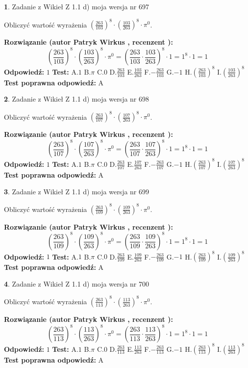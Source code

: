 \documentclass[12pt, a4paper]{article}
\theoremstyle{definition} %
\newtheorem{zad}{}
\newcommand{\zadStart}[1]{\begin{zad}#1\newline}
\newcommand{\zadStop}{\end{zad}}
\newcommand{\rozwStart}[2]{\noindent \textbf{Rozwiązanie (autor #1 , recenzent #2): }\newline}
\newcommand{\rozwStop}{\newline}
\newcommand{\odpStart}{\noindent \textbf{Odpowiedź:}\newline}
\newcommand{\odpStop}{\newline}
\newcommand{\testStart}{\noindent \textbf{Test:}\newline}
\newcommand{\testStop}{\newline}
\newcommand{\kluczStart}{\noindent \textbf{Test poprawna odpowiedź:}\newline}
\newcommand{\kluczStop}{\newline}
\begin{document}
\zadStart{Zadanie z Wikieł Z 1.1 d) moja wersja nr 697}

Obliczyć wartość wyrażenia $(\frac{263}{103})^{8} \cdot (\frac{103}{263})^{8} \cdot \pi^{0}$.
\zadStop
\rozwStart{Patryk Wirkus}{}
$$(\frac{263}{103})^{8} \cdot (\frac{103}{263})^{8} \cdot \pi^{0} = (\frac{263}{103} \cdot \frac{103}{263})^{8} \cdot 1 = 1^{8} \cdot 1 = 1$$
\rozwStop
\odpStart
$1$
\odpStop
\testStart
A.$1$ B.$\pi$ C.$0$ D.$\frac{263}{103}$ E.$\frac{103}{263}$
F.$-\frac{263}{103}$ G.$-1$
H.$(\frac{263}{103})^{8}$
I.$(\frac{103}{263})^{8}$
\testStop
\kluczStart
A
\kluczStop



\zadStart{Zadanie z Wikieł Z 1.1 d) moja wersja nr 698}

Obliczyć wartość wyrażenia $(\frac{263}{107})^{8} \cdot (\frac{107}{263})^{8} \cdot \pi^{0}$.
\zadStop
\rozwStart{Patryk Wirkus}{}
$$(\frac{263}{107})^{8} \cdot (\frac{107}{263})^{8} \cdot \pi^{0} = (\frac{263}{107} \cdot \frac{107}{263})^{8} \cdot 1 = 1^{8} \cdot 1 = 1$$
\rozwStop
\odpStart
$1$
\odpStop
\testStart
A.$1$ B.$\pi$ C.$0$ D.$\frac{263}{107}$ E.$\frac{107}{263}$
F.$-\frac{263}{107}$ G.$-1$
H.$(\frac{263}{107})^{8}$
I.$(\frac{107}{263})^{8}$
\testStop
\kluczStart
A
\kluczStop



\zadStart{Zadanie z Wikieł Z 1.1 d) moja wersja nr 699}

Obliczyć wartość wyrażenia $(\frac{263}{109})^{8} \cdot (\frac{109}{263})^{8} \cdot \pi^{0}$.
\zadStop
\rozwStart{Patryk Wirkus}{}
$$(\frac{263}{109})^{8} \cdot (\frac{109}{263})^{8} \cdot \pi^{0} = (\frac{263}{109} \cdot \frac{109}{263})^{8} \cdot 1 = 1^{8} \cdot 1 = 1$$
\rozwStop
\odpStart
$1$
\odpStop
\testStart
A.$1$ B.$\pi$ C.$0$ D.$\frac{263}{109}$ E.$\frac{109}{263}$
F.$-\frac{263}{109}$ G.$-1$
H.$(\frac{263}{109})^{8}$
I.$(\frac{109}{263})^{8}$
\testStop
\kluczStart
A
\kluczStop



\zadStart{Zadanie z Wikieł Z 1.1 d) moja wersja nr 700}

Obliczyć wartość wyrażenia $(\frac{263}{113})^{8} \cdot (\frac{113}{263})^{8} \cdot \pi^{0}$.
\zadStop
\rozwStart{Patryk Wirkus}{}
$$(\frac{263}{113})^{8} \cdot (\frac{113}{263})^{8} \cdot \pi^{0} = (\frac{263}{113} \cdot \frac{113}{263})^{8} \cdot 1 = 1^{8} \cdot 1 = 1$$
\rozwStop
\odpStart
$1$
\odpStop
\testStart
A.$1$ B.$\pi$ C.$0$ D.$\frac{263}{113}$ E.$\frac{113}{263}$
F.$-\frac{263}{113}$ G.$-1$
H.$(\frac{263}{113})^{8}$
I.$(\frac{113}{263})^{8}$
\testStop
\kluczStart
A
\kluczStop
\end{document}
